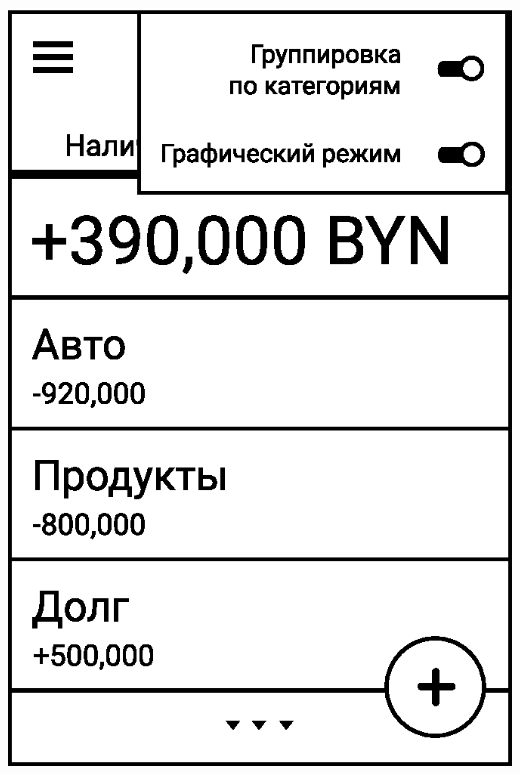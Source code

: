 \documentclass[russian,utf8,a1paper,nostitching,simple]{eskdgraph}
\begin{document}
\begin{ESKDdrawing}
\begin{minipage}{17cm}
\begin{minipage}{7.5cm}
      \vspace{1cm}
      \centering
      \includegraphics[width=\linewidth]{fig/ui_interface_view_modes.eps}
    \end{minipage}
  \end{minipage}
\end{ESKDdrawing}


\setcounter{page}{1}
\begin{ESKDdrawing}
\end{ESKDdrawing}
\end{document}
